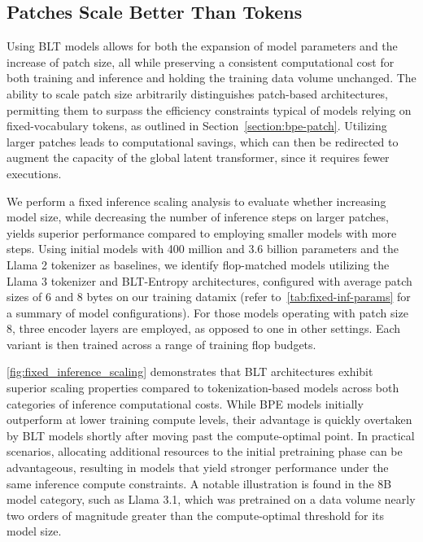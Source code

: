 \subsection{Patches Scale Better Than Tokens} Using {\textsc BLT} models allows for both the expansion of model parameters and the increase of patch size, all while preserving a consistent computational cost for both training and inference and holding the training data volume unchanged. The ability to scale patch size arbitrarily distinguishes patch-based architectures, permitting them to surpass the efficiency constraints typical of models relying on fixed-vocabulary tokens, as outlined in Section~\ref{section:bpe-patch}. Utilizing larger patches leads to computational savings, which can then be redirected to augment the capacity of the global latent transformer, since it requires fewer executions.

We perform a fixed inference scaling analysis to evaluate whether increasing model size, while decreasing the number of inference steps on larger patches, yields superior performance compared to employing smaller models with more steps. Using initial models with 400 million and 3.6 billion parameters and the Llama 2 tokenizer as baselines, we identify flop-matched models utilizing the Llama 3 tokenizer and {\textsc BLT}-Entropy architectures, configured with average patch sizes of 6 and 8 bytes on our training datamix (refer to~\autoref{tab:fixed-inf-params} for a summary of model configurations). For those models operating with patch size 8, three encoder layers are employed, as opposed to one in other settings. Each variant is then trained across a range of training flop budgets.

\autoref{fig:fixed_inference_scaling} demonstrates that {\textsc BLT} architectures exhibit superior scaling properties compared to tokenization-based models across both categories of inference computational costs. While BPE models initially outperform at lower training compute levels, their advantage is quickly overtaken by {\textsc BLT} models shortly after moving past the compute-optimal point. In practical scenarios, allocating additional resources to the initial pretraining phase can be advantageous, resulting in models that yield stronger performance under the same inference compute constraints. A notable illustration is found in the 8B model category, such as Llama 3.1, which was pretrained on a data volume nearly two orders of magnitude greater than the compute-optimal threshold for its model size.

